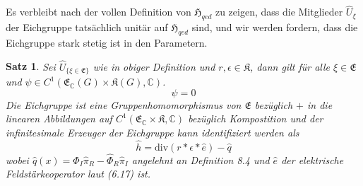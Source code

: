 \documentclass[11pt,a4paper,leqno]{report}
\newtheorem{proposition}{Satz}[chapter]
\numberwithin{equation}{chapter}
\begin{document}
\noindent
Es verbleibt nach der vollen Definition von $\mathfrak{H}_{qed}$ zu zeigen, dass die Mitglieder $\hat{U}_\xi$ der Eichgruppe tats\"achlich unit\"ar auf $\mathfrak{H}_{qed}$ sind, und wir werden fordern, dass die Eichgruppe stark stetig ist in den Parametern.
\begin{proposition}
	Sei $\hat{U}_{\{\xi\in \mathfrak{E}\}}$ wie in obiger Definition und $r,\epsilon\in\mathfrak{K}$, dann gilt f\"ur alle $\xi\in \mathfrak{E}$ und $\psi\in C^1(\mathfrak{E}_\mathbb{C}(G)\times\mathfrak{K}(G), \mathbb{C})$.
	\begin{equation}
		[\hat{H}_{qed}, \hat{U}_\xi]\psi=0
	\end{equation}
	Die Eichgruppe ist eine Gruppenhomomorphismus von $\mathfrak{E}$ bez\"uglich $+$ in die linearen Abbildungen auf $C^1(\mathfrak{E}_\mathbb{C}\times\mathfrak{K},\mathbb{C})$ bez\"uglich Kompostition
	und der infinitesimale Erzeuger der Eichgruppe kann identifiziert werden als
	\begin{equation}
		\hat{h} =  \text{div}(r*\epsilon*\hat{e})-\hat{q}
	\end{equation}
	wobei $\hat{q}(x)=\hat{\Phi}_I\hat{\pi}_R-\hat{\Phi}_R\hat{\pi}_I$ angelehnt an Definition 8.4 und $\hat{e}$ der elektrische Feldst\"arkeoperator laut (6.17) ist. 
\end{proposition}
\end{document}
